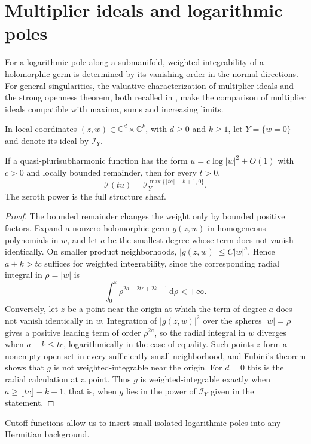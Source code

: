 \section{Multiplier ideals and logarithmic poles}
\label{sec:psh-local-ideals}

For a logarithmic pole along a submanifold, weighted integrability of a holomorphic germ is determined by its vanishing order in the normal directions. For general singularities, the valuative characterization of multiplier ideals and the strong openness theorem, both recalled in \cite{SGPT}, make the comparison of multiplier ideals compatible with maxima, sums and increasing limits.

In local coordinates $(z,w)\in\mathbb C^d\times\mathbb C^k$, with $d\geq0$ and $k\geq1$, let $Y=\{w=0\}$ and denote its ideal by $\mathcal I_Y$.

\begin{lemma}\label{lem:smooth-center-multiplier-ideal}
If a quasi-plurisubharmonic function has the form $u=c\log|w|^2+O(1)$ with $c>0$ and locally bounded remainder, then for every $t>0$,
\[
 \mathcal I(tu)=\mathcal I_Y^{\max\{\lfloor tc\rfloor-k+1,0\}}.
\]
The zeroth power is the full structure sheaf.
\end{lemma}
\begin{proof}
The bounded remainder changes the weight only by bounded positive factors. Expand a nonzero holomorphic germ $g(z,w)$ in homogeneous polynomials in $w$, and let $a$ be the smallest degree whose term does not vanish identically. On smaller product neighborhoods, $|g(z,w)|\leq C|w|^a$. Hence $a+k>tc$ suffices for weighted integrability, since the corresponding radial integral in $\rho=|w|$ is
\[
 \int_0^\varepsilon \rho^{2a-2tc+2k-1}\,\mathrm{d}\rho<+\infty.
\]
Conversely, let $z$ be a point near the origin at which the term of degree $a$ does not vanish identically in $w$. Integration of $|g(z,w)|^2$ over the spheres $|w|=\rho$ gives a positive leading term of order $\rho^{2a}$, so the radial integral in $w$ diverges when $a+k\leq tc$, logarithmically in the case of equality. Such points $z$ form a nonempty open set in every sufficiently small neighborhood, and Fubini's theorem shows that $g$ is not weighted-integrable near the origin. For $d=0$ this is the radial calculation at a point. Thus $g$ is weighted-integrable exactly when $a\geq\lfloor tc\rfloor-k+1$, that is, when $g$ lies in the power of $\mathcal I_Y$ given in the statement.
\end{proof}

Cutoff functions allow us to insert small isolated logarithmic poles into any Hermitian background.


